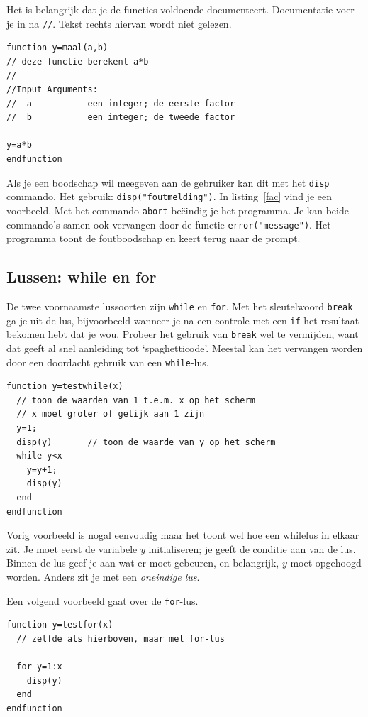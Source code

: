 Het is belangrijk dat je de functies voldoende documenteert. Documentatie voer je in na \verb+//+. Tekst rechts hiervan wordt niet gelezen. 

\begin{lstlisting}[caption={Elke functie bevat enkele regels uitleg!}, label=Maal.sci]
function y=maal(a,b)
// deze functie berekent a*b
//
//Input Arguments:
//  a           een integer; de eerste factor
//  b           een integer; de tweede factor

y=a*b
endfunction
\end{lstlisting}

Als je een boodschap wil meegeven aan de gebruiker  kan dit met het \verb+disp+ commando. Het gebruik: \verb+disp("foutmelding")+. In listing~\ref{fac} vind je een voorbeeld. Met het commando \verb+abort+ beëindig je het programma. Je kan beide commando's samen ook vervangen door de functie \verb/error("message")/. Het programma toont de foutboodschap en keert terug naar de prompt. 


\subsection{Lussen: while en for}
De twee voornaamste lussoorten zijn 
\verb+while+ en \verb+for+. Met het sleutelwoord \verb+break+ ga je uit de lus, bijvoorbeeld wanneer je na een controle met een \verb+if+ het resultaat bekomen hebt dat je wou. Probeer het gebruik van \verb/break/ wel te vermijden, want dat geeft al snel aanleiding tot `spaghetticode'. Meestal kan het vervangen worden door een doordacht gebruik van een \verb/while/-lus.

\begin{lstlisting}[caption={Eenvoudig voorbeeld van een whilelus}, label=simpele while]
function y=testwhile(x)
  // toon de waarden van 1 t.e.m. x op het scherm
  // x moet groter of gelijk aan 1 zijn
  y=1;
  disp(y) 		// toon de waarde van y op het scherm
  while y<x
    y=y+1;
    disp(y)
  end
endfunction
\end{lstlisting}

Vorig voorbeeld is nogal eenvoudig maar het toont wel hoe een whilelus in elkaar zit. Je moet eerst de variabele $y$ initialiseren; je geeft de conditie aan van de lus. Binnen de lus geef je aan wat er moet gebeuren, en belangrijk, $y$ moet opgehoogd worden. Anders zit je met een \emph{oneindige lus}.

Een volgend voorbeeld gaat over de \verb+for+-lus.

\begin{lstlisting}[caption={Eenvoudig voorbeeld van een for-lus}, label=simpele for]
function y=testfor(x)
  // zelfde als hierboven, maar met for-lus
  
  for y=1:x
    disp(y)
  end
endfunction
\end{lstlisting}


